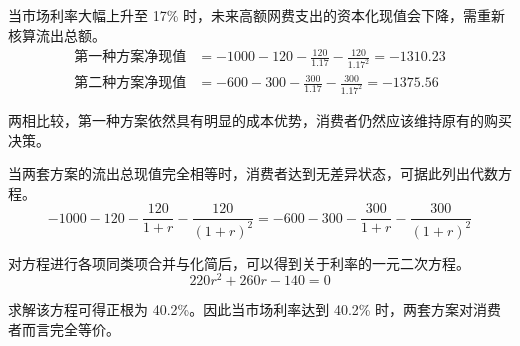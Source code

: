 \begin{enumerate}[label=\textbf{\arabic*.}, leftmargin=*]
		当市场利率大幅上升至 17\% 时，未来高额网费支出的资本化现值会下降，需重新核算流出总额。
		\[
		\begin{aligned}
			\text{第一种方案净现值} &= -1000 - 120 - \frac{120}{1.17} - \frac{120}{1.17^2} = -1310.23 \\
			\text{第二种方案净现值} &= -600 - 300 - \frac{300}{1.17} - \frac{300}{1.17^2} = -1375.56
		\end{aligned}
		\]
		
		两相比较，第一种方案依然具有明显的成本优势，消费者仍然应该维持原有的购买决策。
		
		当两套方案的流出总现值完全相等时，消费者达到无差异状态，可据此列出代数方程。
		\[
		-1000 - 120 - \frac{120}{1+r} - \frac{120}{(1+r)^2} = -600 - 300 - \frac{300}{1+r} - \frac{300}{(1+r)^2}
		\]
		
		对方程进行各项同类项合并与化简后，可以得到关于利率的一元二次方程。
		\[
		220r^2 + 260r - 140 = 0
		\]
		
		求解该方程可得正根为 40.2\%。因此当市场利率达到 40.2\% 时，两套方案对消费者而言完全等价。
	\end{enumerate}
		
	